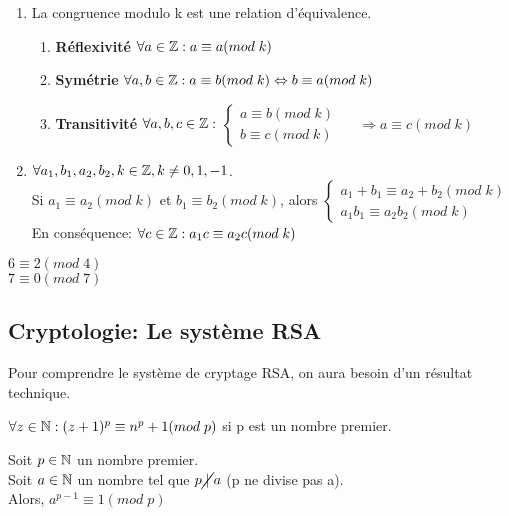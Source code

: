 \begin{enumerate}
\item La congruence modulo k est une relation d'équivalence.
	\begin{enumerate}[-]
	\item \textbf{Réflexivité} $\forall a \in \mathbb{Z}: a \equiv a(mod\;k)$
	\item \textbf{Symétrie} $\forall a,b \in \mathbb{Z}: a \equiv b(mod\;k) \Leftrightarrow b \equiv a(mod\;k)$
	\item \textbf{Transitivité} $\forall a,b,c \in \mathbb{Z}:$
				$ \left\{\begin{matrix}
				a \equiv b(mod\;k)\\ 
				b \equiv c(mod\;k)
				\end{matrix}\right.$ $\quad \Rightarrow a\equiv c(mod\;k)$
	\end{enumerate}

\item $\forall a_1,b_1,a_2,b_2,k \in \mathbb{Z}, k\neq 0,1,-1$. \\
Si $a_1 \equiv a_2 (mod\;k)$ et $b_1 \equiv b_2 (mod\;k)$, alors $\left\{\begin{matrix}
					a_1 + b_1 \equiv a_2 + b_2 (mod\;k)\\ 
					a_1 b_1 \equiv a_2 b_2 (mod\;k)
					\end{matrix}\right.$\\
En conséquence: $\forall c\in \mathbb{Z}: a_1 c \equiv a_2 c(mod\;k)$
\end{enumerate}

\begin{exmp}
$6 \equiv 2(mod\;4)$\\
$7 \equiv 0(mod\;7)$
\end{exmp}

\subsection{Cryptologie: Le système RSA}

Pour comprendre le système de cryptage RSA, on aura besoin d'un résultat technique.

\begin{lemme}
$\forall z \in \mathbb{N}: (z+1)^p \equiv n^p + 1(mod\;p)$ si p est un nombre premier.
\end{lemme}

\begin{thrm}
Soit $p\in \mathbb{N}$ un nombre premier.\\
Soit $a\in \mathbb{N}$ un nombre tel que $p\cancel{\;|\;}a$ (p ne divise pas a).\\
Alors, $a^{p-1} \equiv 1(mod\;p)$\\
\end{thrm}


